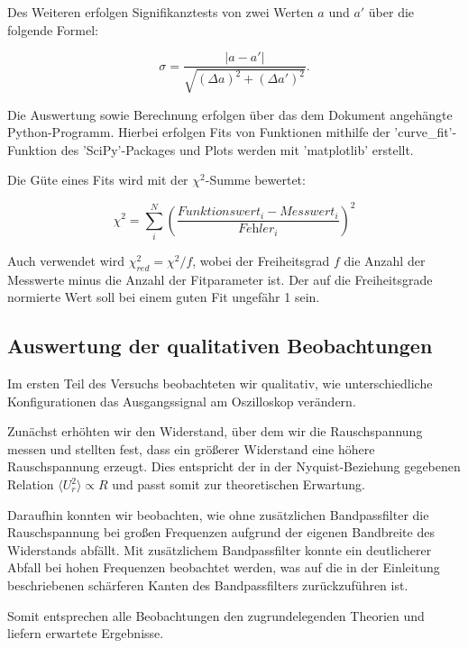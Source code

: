 \documentclass{article}
\begin{document}
Des Weiteren erfolgen Signifikanztests von zwei Werten $a$ und $a'$ über die folgende Formel:

\begin{equation}
    \sigma = \frac{|a-a'|}{\sqrt{(\Delta a)^2 + (\Delta a')^2}}.
\end{equation}

Die Auswertung sowie Berechnung erfolgen über das dem Dokument angehängte Python-Programm. Hierbei erfolgen Fits von Funktionen mithilfe der 'curve\_fit'-Funktion des 'SciPy'-Packages und Plots werden mit 'matplotlib' erstellt.

Die Güte eines Fits wird mit der $\chi^2$-Summe bewertet:

\begin{equation}
    \chi^2 = \sum_i^N \left( \frac{\textit{Funktionswert}_i - \textit{Messwert}_i}{\textit{Fehler}_i} \right)^2
\end{equation}

Auch verwendet wird $\chi^2_{red} = \chi^2 / f$, wobei der Freiheitsgrad $f$ die Anzahl der Messwerte minus die Anzahl der Fitparameter ist. Der auf die Freiheitsgrade normierte Wert soll bei einem guten Fit ungefähr 1 sein.


\newpage

\subsection{Auswertung der qualitativen Beobachtungen}

Im ersten Teil des Versuchs beobachteten wir qualitativ, wie unterschiedliche Konfigurationen das Ausgangssignal am Oszilloskop verändern. 

Zunächst erhöhten wir den Widerstand, über dem wir die Rauschspannung messen und stellten fest, dass ein größerer Widerstand eine höhere Rauschspannung erzeugt. Dies entspricht der in der Nyquist-Beziehung gegebenen Relation $\langle U_r^2 \rangle \propto R$ und passt somit zur theoretischen Erwartung. 

Daraufhin konnten wir beobachten, wie ohne zusätzlichen Bandpassfilter die Rauschspannung bei großen Frequenzen aufgrund der eigenen Bandbreite des Widerstands abfällt. Mit zusätzlichem Bandpassfilter konnte ein deutlicherer Abfall bei hohen Frequenzen beobachtet werden, was auf die in der Einleitung beschriebenen schärferen Kanten des Bandpassfilters zurückzuführen ist.

Somit entsprechen alle Beobachtungen den zugrundelegenden Theorien und liefern erwartete Ergebnisse. 
\end{document}
